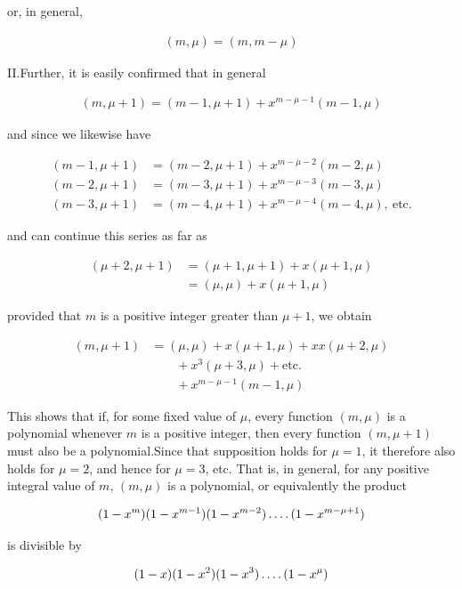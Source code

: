 or, in general,

\[
\begin{aligned}
(m,\mu)=(m,m-\mu)
\end{aligned}
\]

II.\quad Further, it is easily confirmed that in general

\[
\begin{aligned}
(m,\mu+1)=(m-1,\mu+1)+x^{m-\mu-1}(m-1,\mu)
\end{aligned}
\]

and since we likewise have

\[
\begin{aligned}
(m-1,\mu+1)&=(m-2,\mu+1)+x^{m-\mu-2}(m-2,\mu)\\
(m-2,\mu+1)&=(m-3,\mu+1)+x^{m-\mu-3}(m-3,\mu)\\
(m-3,\mu+1)&=(m-4,\mu+1)+x^{m-\mu-4}(m-4,\mu),\ \text{etc.}
\end{aligned}
\]

and can continue this series as far as

\[
\begin{aligned}
(\mu+2,\mu+1)&=(\mu+1,\mu+1)+x(\mu+1,\mu)\\
&=(\mu,\mu)+x(\mu+1,\mu)
\end{aligned}
\]

provided that $m$ is a positive integer greater than $\mu+1$, we obtain

\[
\begin{aligned}
(m,\mu+1)&=(\mu,\mu)+x(\mu+1,\mu)+xx(\mu+2,\mu)\\
&\qquad+x^3(\mu+3,\mu)+\text{etc.}\\
&\qquad+x^{m-\mu-1}(m-1,\mu)
\end{aligned}
\]

This shows that if, for some fixed value of $\mu$, every function $(m,\mu)$ is a polynomial whenever $m$ is a positive integer, then every function $(m,\mu+1)$ must also be a polynomial.\quad Since that supposition holds for $\mu=1$, it therefore also holds for $\mu=2$, and hence for $\mu=3$, etc. That is, in general, for any positive integral value of $m$, $(m,\mu)$ is a polynomial, or equivalently the product

\[
\begin{aligned}
(1-x^m)(1-x^{m-1})(1-x^{m-2})\mathinner{.\,.\,.\,.}(1-x^{m-\mu+1})
\end{aligned}
\]

is divisible by

\[
\begin{aligned}
(1-x)(1-x^2)(1-x^3)\mathinner{.\,.\,.\,.}(1-x^\mu)
\end{aligned}
\]

